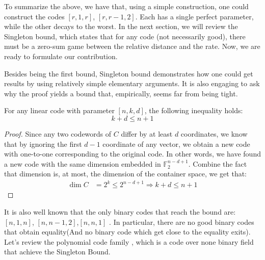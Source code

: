   To summarize the above, we have that, using a simple construction, one could construct the codes $[r, 1, r]$, $[r, r-1, 2]$. Each has a single perfect parameter, while the other decays to the worst. In the next section, we will review the Singleton bound, which states that for any code (not necessarily good), there must be a zero-sum game between the relative distance and the rate.
  Now, we are ready to formulate our contribution. 


  Besides being the first bound, Singleton bound demonstrates how one could get results by using relatively simple elementary arguments. It is also engaging to ask why the proof yields a bound that, empirically, seems far from being tight.
  \begin{theorem*}\label{theorem*:Sing}  For any linear code with parameter $[n,k,d]$, the following inequality holds:
  \begin{equation*}
    k+ d \le n + 1
  \end{equation*} 
  \end{theorem*}

\begin{proof} Since any two codewords of $C$ differ by at least $d$ coordinates, we know that by ignoring the first $d-1$ coordinate of any vector, we obtain a new code with one-to-one corresponding to the original code. In other words, we have found a new code with the same dimension embedded in $\mathbb{F}_{2}^{n-d+1}$. Combine the fact that dimension is, at most, the dimension of the container space, we get that:  
  \begin{equation*}
    \begin{split}
      \dim C &= 2^{k} \le 2^{n-d+1} \Rightarrow k+d \le n + 1
    \end{split}
  \end{equation*}
\end{proof}

It is also well known that the only binary codes that reach the bound are: $[n,1,n]$, $[n,n-1,2]$,$[n,n,1]$ \cite{eczoo_mds}. In particular, there are no good binary codes that obtain equality(And no binary code which get close to the equality exits). Let's review the polynomial code family \cite{Reed1960PolynomialCO}, which is a code over none binary field that achieve the Singleton Bound. 

